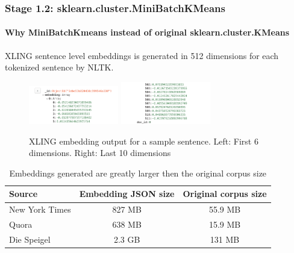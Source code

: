 \documentclass{tum-presentation}
\begin{document}
\begin{frame}[fragile]
  \frametitle{Stage 1.2: sklearn.cluster.MiniBatchKMeans}
  \framesubtitle{Why MiniBatchKmeans instead of original sklearn.cluster.KMeans}
  \begin{description}
  XLING sentence level embeddings is generated in 512 dimensions for each tokenized sentence by NLTK.
  \end{description}
  \begin{figure}[t]
    \includegraphics[width=0.35\textwidth]{presentation_2/images/embedding-sample-1.png}
    \includegraphics[width=0.35\textwidth]{presentation_2/images/embedding-sample-2.png}
    \caption{XLING embedding output for a sample sentence. Left: First 6 dimensions. Right: Last 10 dimensions}
  \end{figure}
  \small
  \begin{table}[t]
    \begin{tabular}{lcc}
    \hline
      Source & Embedding JSON size & Original corpus size\\ \hline
      New York Times & 827 MB & 55.9 MB\\
      Quora & 638 MB & 15.9 MB\\
      Die Speigel & 2.3 GB & 131 MB\\
    \hline
    \end{tabular}
    \caption{Embeddings generated are greatly larger then the original corpus size}
  \end{table}
\end{frame}
\end{document}
